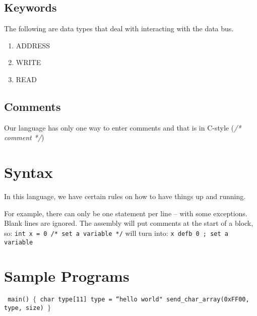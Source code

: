 \documentclass[letterpaper, 12pt]{article}
\begin{document}
\subsection{Keywords}
The following are data types that deal with interacting with the data bus.
\begin{enumerate}
\item ADDRESS
\item WRITE
\item READ
\end{enumerate}
\subsection{Comments}
Our language has only one way to enter comments and that is in C-style
(\textit{/* comment */})
\section{Syntax}
In this language, we have certain rules on how to have things up and running.

For example, there can only be one statement per line -- with some exceptions.
Blank lines are ignored. The assembly will put comments at the start of a block,
so:
\newline
\texttt{int x = 0 /* set a variable */}
will turn into:
\newline
\newline
\texttt{x defb 0 ; set a variable }
\section{Sample Programs}
\texttt{ 
main()
\newline
$\{$
\newline
  char type[11]
\newline
  type = ``hello world"
\newline
  send\_char\_array(0xFF00, type, size)
\newline
$\}$
\newline
}
\end{document}
